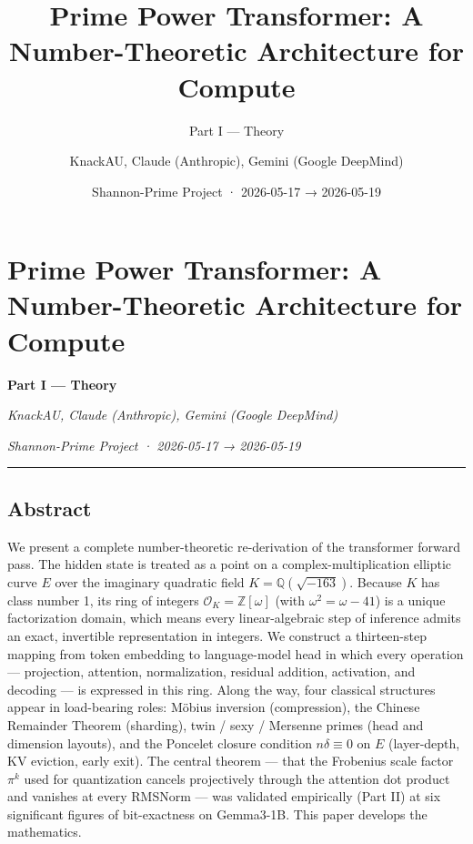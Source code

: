 \documentclass[
  11pt,
]{article}
\title{Prime Power Transformer: A Number-Theoretic Architecture for
Compute}
\subtitle{Part I --- Theory}
\author{KnackAU, Claude (Anthropic), Gemini (Google DeepMind)}
\date{Shannon-Prime Project · 2026-05-17 → 2026-05-19}
\begin{document}
\maketitle

\hypertarget{prime-power-transformer-a-number-theoretic-architecture-for-compute}{%
\section{Prime Power Transformer: A Number-Theoretic Architecture for
Compute}\label{prime-power-transformer-a-number-theoretic-architecture-for-compute}}

\textbf{Part I --- Theory}

\emph{KnackAU, Claude (Anthropic), Gemini (Google DeepMind)}

\emph{Shannon-Prime Project · 2026-05-17 → 2026-05-19}

\begin{center}\rule{0.5\linewidth}{0.5pt}\end{center}

\hypertarget{abstract}{%
\subsection{Abstract}\label{abstract}}

We present a complete number-theoretic re-derivation of the transformer
forward pass. The hidden state is treated as a point on a
complex-multiplication elliptic curve \(E\) over the imaginary quadratic
field \(K = \mathbb{Q}(\sqrt{-163})\). Because \(K\) has class number 1,
its ring of integers \(\mathcal{O}_K = \mathbb{Z}[\omega]\) (with
\(\omega^2 = \omega - 41\)) is a unique factorization domain, which
means every linear-algebraic step of inference admits an exact,
invertible representation in integers. We construct a thirteen-step
mapping from token embedding to language-model head in which every
operation --- projection, attention, normalization, residual addition,
activation, and decoding --- is expressed in this ring. Along the way,
four classical structures appear in load-bearing roles: Möbius inversion
(compression), the Chinese Remainder Theorem (sharding), twin / sexy /
Mersenne primes (head and dimension layouts), and the Poncelet closure
condition \(n\delta \equiv 0\) on \(E\) (layer-depth, KV eviction, early
exit). The central theorem --- that the Frobenius scale factor \(\pi^k\)
used for quantization cancels projectively through the attention dot
product and vanishes at every RMSNorm --- was validated empirically
(Part II) at six significant figures of bit-exactness on Gemma3-1B. This
paper develops the mathematics.
\end{document}
